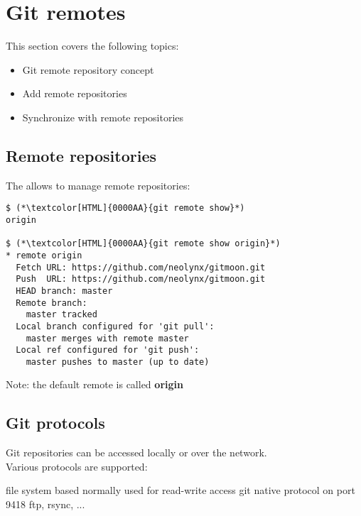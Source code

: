 \section{Git remotes}
\begin{frame}[fragile]
  \slidetitle
  This section covers the following topics:
  \begin{itemize}
    \item Git remote repository concept
    \item Add remote repositories
    \item Synchronize with remote repositories
  \end{itemize}
\end{frame}

\subsection{Remote repositories}
\begin{frame}[fragile]
  \subslidetitle
  The  allows to manage remote repositories:
  \begin{lstlisting}
$ (*\textcolor[HTML]{0000AA}{git remote show}*)
origin

$ (*\textcolor[HTML]{0000AA}{git remote show origin}*)
* remote origin
  Fetch URL: https://github.com/neolynx/gitmoon.git
  Push  URL: https://github.com/neolynx/gitmoon.git
  HEAD branch: master
  Remote branch:
    master tracked
  Local branch configured for 'git pull':
    master merges with remote master
  Local ref configured for 'git push':
    master pushes to master (up to date)
\end{lstlisting}
  \vspace{1em}
  Note: the default remote is called \textbf{origin}
\end{frame}

\subsection{Git protocols}
\begin{frame}[fragile]
  \subslidetitle
  Git repositories can be accessed locally or over the network.
  \\
  \vspace{1em}
  Various protocols are supported:
  \begin{itemize}
    {file system based}
      {normally used for read-write access}
      {git native protocol on port 9418}
   {ftp, rsync, ...}
  \end{itemize}
\end{frame}

